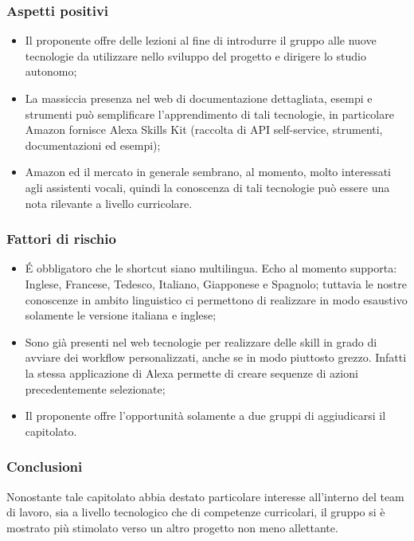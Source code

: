 \subsubsection{Aspetti positivi}
\begin{itemize}
    \item Il proponente offre delle lezioni al fine di introdurre il gruppo alle 
nuove tecnologie da utilizzare nello sviluppo del progetto e dirigere lo studio 
autonomo;
    \item La massiccia presenza nel web di documentazione dettagliata, esempi e 
strumenti può semplificare l'apprendimento di tali tecnologie, in 
particolare Amazon fornisce Alexa Skills Kit (raccolta di API self-service, 
strumenti, documentazioni ed esempi);
    \item Amazon ed il mercato in generale sembrano, al momento, molto interessati 
agli assistenti vocali, quindi la conoscenza di tali tecnologie può essere una 
nota rilevante a livello curricolare.
\end{itemize}
\subsubsection{Fattori di rischio}
\begin{itemize}
    \item É obbligatoro che le shortcut siano multilingua. Echo al momento 
supporta: Inglese, Francese, Tedesco, Italiano, Giapponese e Spagnolo; tuttavia 
le nostre conoscenze in ambito linguistico ci permettono di realizzare in modo 
esaustivo solamente le versione italiana e inglese;
    \item Sono già presenti nel web tecnologie per realizzare delle skill in 
    grado di avviare dei workflow personalizzati, anche se in modo piuttosto grezzo.
    Infatti la stessa applicazione di Alexa permette di creare sequenze di azioni precedentemente 
selezionate;
    \item Il proponente offre l'opportunità solamente a due gruppi di 
aggiudicarsi il capitolato.
\end{itemize}
\subsubsection{Conclusioni}
Nonostante tale capitolato abbia destato particolare interesse all'interno del 
team di lavoro, sia a livello tecnologico che di competenze curricolari, il 
gruppo si è mostrato più stimolato verso un altro progetto non meno allettante.


